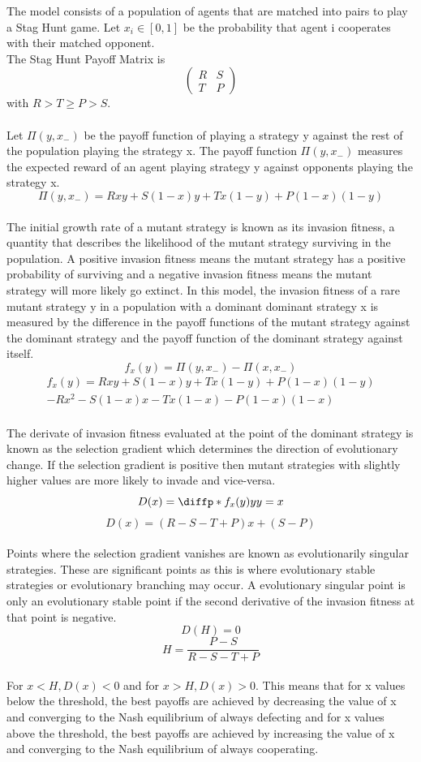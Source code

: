 \documentclass[]{llncs}
\begin{document}
The model consists of a population of agents that are matched into pairs to play a Stag Hunt game. Let $x_i \in [0,1]$ be the probability that agent i cooperates with their matched opponent. \\
The Stag Hunt Payoff Matrix is 
\[
  \begin{pmatrix} 
   R & S  \\
   T & P  
   \end{pmatrix} 
\]
with $ R > T \geq P > S. $ \\
\\
Let $ \Pi ( y, x_{-} )$ be the payoff function of playing a strategy y against the rest of the population playing the strategy x. The payoff function $ \Pi ( y, x_{-} )$ measures the expected reward of an agent playing strategy y against opponents playing the strategy x. 
\[
\Pi ( y, x_{-} ) = R x y + S (1-x) y +  T x (1-y) + P (1-x) (1-y)
\]
\\
The initial growth rate of a mutant strategy is known as its invasion fitness, a quantity that describes the likelihood of the mutant strategy surviving in the population. A positive invasion fitness means the mutant strategy has a positive probability of surviving and a negative invasion fitness means the mutant strategy will more likely go extinct. In this model, the invasion fitness of a rare mutant strategy y in a population with a dominant dominant strategy x is measured by the difference in the payoff functions of the mutant strategy against the dominant strategy and the payoff function of the dominant strategy against itself. 
\[
f_x(y) = \Pi ( y, x_{-} ) - \Pi ( x, x_{-} )
\]
\begin{multline}
f_x(y) = R x y + S (1-x) y +  T x (1-y) + P (1-x) (1-y) \\ - R x^2 - S (1-x) x - T x (1-x) - P (1-x) (1-x)
\end{multline}
\\
The derivate of invasion fitness evaluated at the point of the dominant strategy is known as the selection gradient which determines the direction of evolutionary change. If the selection gradient is positive then mutant strategies with slightly higher values are more likely to invade and vice-versa. 
\[
D(x) = \diffp*{f_x(y)}{y}{y=x}
\]
\[
D(x) = (R - S - T +P) x + (S-P)
\]
\\
Points where the selection gradient vanishes are known as evolutionarily singular strategies. These are significant points as this is where evolutionary stable strategies or evolutionary branching may occur. A evolutionary singular point is only an evolutionary stable point if the second derivative of the invasion fitness at that point is negative. 
\[
D(H) = 0
\]
\[H = \frac{P-S}{R - S - T +P} 
\]
\\
For $x < H, D(x) < 0$ and for $x > H, D(x) > 0.$ This means that for x values below the threshold, the best payoffs are achieved by decreasing the value of x and converging to the Nash equilibrium of always defecting and for x values above the threshold, the best payoffs are achieved by increasing the value of x and converging to the Nash equilibrium of always cooperating. 
\end{document}
